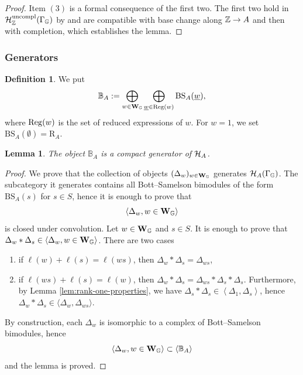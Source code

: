 \documentclass[a4paper, 10pt, oneside, reqno]{amsart}
\theoremstyle{plain}
\newtheorem{lem}[thm]{Lemma}
\theoremstyle{definition}
\newtheorem{defi}[thm]{Definition}
\theoremstyle{remark}
\newcommand{\Gbb}{\mathbb{G}}
\newcommand{\RR}{\mathrm{R}}
\newcommand{\BS}{\mathrm{BS}}
\newcommand{\uncompl}{\mathrm{uncompl}}
\begin{document}
\begin{proof}
Item $(3)$ is a formal consequence of the first two. The first two hold in $\Hcal_{\Z}^{\uncompl}(\Gamma_{\Gbb})$ by \cite{EteveEberhardt} and are compatible with base change along $\mathbb{Z} \to A$ and then with completion, which establishes the lemma.
\end{proof}

\subsubsection{Generators}

\begin{defi}
We put
\[
 \mathbb{B}_A := \bigoplus_{w\in \Wbf_{\Gbb}}
       \bigoplus_{\underline w\in\Reg(w)}\BS_A(\underline w),
\]
where $\mathrm{Reg}(w)$ is the set of reduced expressions of $w$. For $w = 1$, we set $\BS_A(\emptyset) = \RR_A$.
\end{defi}


\begin{lem}\label{lem:compact-generator-of-hecke-cat}
The object $\mathbb{B}_A$ is a compact generator of $\mathcal{H}_{A}$. 
\end{lem}

\begin{proof}
We prove that the collection of objects $(\Delta_w)_{w \in \Wbf_{\Gbb}}$ generates $\Hcal_{A}(\Gamma_{\Gbb})$. The subcategory it generates contains all Bott--Samelson bimodules of the form $\BS_A(s)$ for $s \in S$, hence it is enough to prove that 
$$\left \langle \Delta_w, w \in \Wbf_{\Gbb} \right\rangle$$
is closed under convolution. Let $w \in  \Wbf_{\Gbb}$ and $s \in S$. It is enough to prove that $\Delta_w * \Delta_s \in \left \langle \Delta_w, w \in \Wbf_{\Gbb} \right\rangle$. There are two cases 
\begin{enumerate}
\item if $\ell(w) + \ell(s) = \ell(ws)$, then $\Delta_w * \Delta_s = \Delta_{ws}$, 
\item if $\ell(ws) + \ell(s) = \ell(w)$, then $\Delta_w * \Delta_s = \Delta_{ws} * \Delta_s * \Delta_s$. Furthermore, by Lemma \ref{lem:rank-one-properties}, we have $\Delta_s * \Delta_s \in \left\langle \Delta_1, \Delta_s \right\rangle$, hence $\Delta_w * \Delta_s \in \langle \Delta_{w}, \Delta_{ws} \rangle$.
\end{enumerate}
By construction, each $\Delta_w$ is isomorphic to a complex of Bott--Samelson bimodules, hence 
$$\left\langle \Delta_w, w \in \Wbf_{\Gbb} \right\rangle \subset \left\langle \mathbb{B}_A \right\rangle$$
and the lemma is proved. 
\end{proof}
\end{document}
